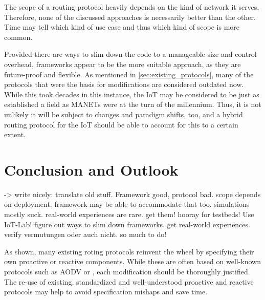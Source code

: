 \documentclass[a4paper,10pt]{scrartcl}
\begin{document}
The scope of a routing protocol heavily depends on the kind of network it serves. Therefore, none of the discussed approaches is necessarily better than the other. Time may tell which kind of use case and thus which kind of scope is more common.

Provided there are ways to slim down the code to a manageable size and control overhead, frameworks appear to be the more suitable approach, as they are future-proof and flexible. As mentioned in \ref{sec:existing_protocols}, many of the protocols that were the basis for modifications are considered outdated now. While this took decades in this instance, the IoT may be considered to be just as established a field as MANETs were at the turn of the millennium. Thus, it is not unlikely it will be subject to changes and paradigm shifts, too, and a hybrid routing protocol for the IoT should be able to account for this to a certain extent.

\section{Conclusion and Outlook}
\label{sec:conclusion}
-> write nicely: translate old stuff. Framework good, protocol bad. scope depends on deployment. framework may be able to accommodate that too. simulations mostly suck. real-world experiences are rare. get them!  hooray for testbeds! Use IoT-Lab!
figure out ways to slim down frameworks. get real-world experiences. verify vermutungen oder auch nicht. so much to do!

As shown, many existing roting protocols reinvent the wheel by specifying their own proactive or reactive components. While these are often based on well-known protocols such as AODV or , each modification should be thoroughly justified. The re-use of existing, standardized and well-understood proactive and reactive protocols may help to avoid specification mishaps and save time.

\printglossaries

{\small


}
\end{document}
